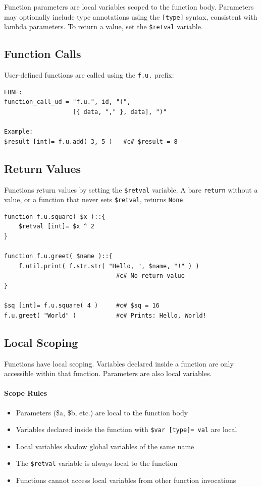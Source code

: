 Function parameters are local variables scoped to the function body. Parameters may optionally include type annotations using the \texttt{[type]} syntax, consistent with lambda parameters. To return a value, set the \texttt{\$retval} variable.

\subsection{Function Calls}
User-defined functions are called using the \texttt{f.u.} prefix:
\begin{verbatim}
EBNF:
function_call_ud = "f.u.", id, "(", 
                   [{ data, "," }, data], ")"

Example:
$result [int]= f.u.add( 3, 5 )   #c# $result = 8
\end{verbatim}

\subsection{Return Values}
Functions return values by setting the \texttt{\$retval} variable. A bare \texttt{return} without a value, or a function that never sets \texttt{\$retval}, returns \texttt{None}.
\begin{verbatim}
function f.u.square( $x )::{
    $retval [int]= $x ^ 2
}

function f.u.greet( $name )::{
    f.util.print( f.str.str( "Hello, ", $name, "!" ) )
                               #c# No return value
}

$sq [int]= f.u.square( 4 )     #c# $sq = 16
f.u.greet( "World" )           #c# Prints: Hello, World!
\end{verbatim}

\subsection{Local Scoping}
\label{sec:function-scope}
Functions have local scoping. Variables declared inside a function are only accessible within that function. Parameters are also local variables.

\paragraph{Scope Rules}
\begin{itemize}
\item Parameters (\$a, \$b, etc.) are local to the function body
\item Variables declared inside the function with \texttt{\$var [type]= val} are local
\item Local variables shadow global variables of the same name
\item The \texttt{\$retval} variable is always local to the function
\item Functions cannot access local variables from other function invocations
\end{itemize}

